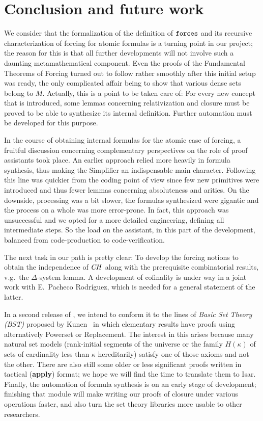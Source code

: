 \section{Conclusion and future work}
\label{sec:conclusion}

We consider that the formalization of the definition of $\mathop{\mathtt{forces}}$
and its recursive characterization of forcing for atomic formulas is
a turning point
in our project; the reason for this is that all further
developments will not involve such a daunting metamathematical
component. Even the proofs of the Fundamental Theorems of Forcing
turned out to follow rather smoothly after this initial setup was
ready, the only complicated affair being to show that various dense sets belong
to $M$. 
%
Actually, this is a point to be taken care of: For every new
concept that is introduced, some lemmas concerning 
relativization and closure must be proved to be able to synthesize its
internal definition. Further automation must be developed for this
purpose.

In the course of obtaining internal formulas for the atomic case of
forcing, a fruitful discussion
concerning complementary perspectives on the role of proof assistants
took place. An earlier approach relied more heavily in formula
synthesis, thus making the Simplifier an indispensable main
character. Following this line was quickier from the coding point of
view since few new primitives were introduced and thus fewer lemmas
concerning absoluteness and arities. On the downside, processing was a
bit slower, the formulas synthesized were gigantic and the process on
a whole was more error-prone. In fact, this approach was unsuccessful
and we opted for a more detailed engineering, defining all
intermediate steps. So the load on the assistant, in this part of the
development, balanced from code-production to code-verification. 

The next task in our path is pretty clear: To develop the forcing
notions to obtain the independence of $\mathit{CH}$ 
along with the prerequisite combinatorial results, v.g.\ the
$\Delta$-system lemma. A development of cofinality is under way in a
joint work with E.~Pacheco Rodríguez, which is needed for a general
statement of the latter. 

In a second release of , we intend to
conform it to the lines of \emph{Basic Set Theory (BST)} proposed by
Kunen~\cite[I.3.1]{kunen2011set} in which elementary results have
proofs using alternatively Powerset or Replacement. The interest in
this arises because many natural set models (rank-initial segments of
the universe or the family $H(\kappa)$ of sets of cardinality less
than $\kappa$ hereditarily) satisfy one of those axioms and not the
other. There are also still some older or less significant proofs
written in tactical (\textbf{apply}) format; we hope we will find the
time to translate them to Isar. Finally, the automation of formula
synthesis is on an early stage of development; finishing that module
will make writing our proofs of closure under various operations
faster, and also turn the set theory libraries more usable to other
researchers.

